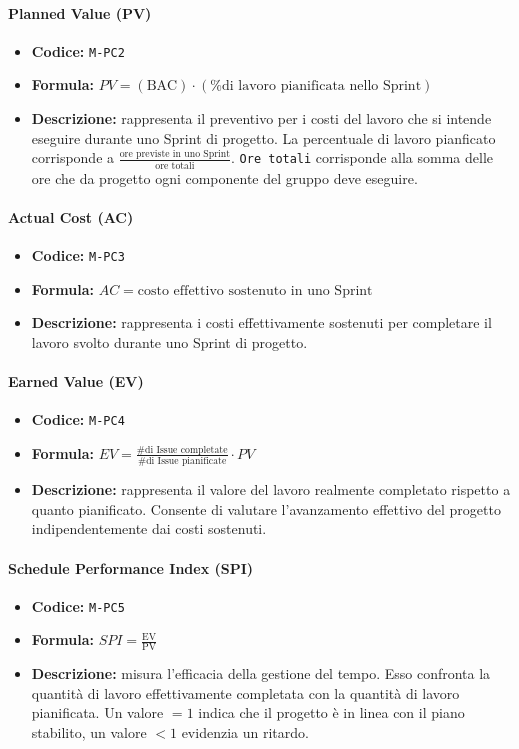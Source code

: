 \documentclass[a4paper,12pt]{article}
\begin{document}
\paragraph{Planned Value (PV)}
\begin{itemize}
    \item \textbf{Codice:} \texttt{M-PC2}
    \item \textbf{Formula:} $PV=(\text{BAC})\cdot(\text{\% di lavoro pianificata nello Sprint})$
    \item \textbf{Descrizione:} rappresenta il preventivo per i costi del lavoro che si intende eseguire durante uno Sprint di progetto. La percentuale di lavoro pianficato corrisponde a $\frac{\text{ore previste in uno Sprint}}{\text{ore totali}}$. \texttt{Ore totali} corrisponde alla somma delle ore che da progetto ogni componente del gruppo deve eseguire.
\end{itemize}

\paragraph{Actual Cost (AC)}
\begin{itemize}
    \item \textbf{Codice:} \texttt{M-PC3}
    \item \textbf{Formula:} $AC=\text{costo effettivo sostenuto in uno Sprint}$
    \item \textbf{Descrizione:} rappresenta i costi effettivamente sostenuti per completare il lavoro svolto durante uno Sprint di progetto.
\end{itemize}

\paragraph{Earned Value (EV)}
\begin{itemize}
    \item \textbf{Codice:} \texttt{M-PC4}
    \item \textbf{Formula:} $EV=\frac{\text{\# di Issue completate}}{\text{\# di Issue pianificate}}\cdot PV$
    \item \textbf{Descrizione:} rappresenta il valore del lavoro realmente completato rispetto a quanto pianificato. Consente di valutare l’avanzamento effettivo del progetto indipendentemente dai costi sostenuti.
\end{itemize}

\paragraph{Schedule Performance Index (SPI)}
\begin{itemize}
    \item \textbf{Codice:} \texttt{M-PC5}
    \item \textbf{Formula:} $SPI=\frac{\text{EV}}{\text{PV}}$
    \item \textbf{Descrizione:} misura l'efficacia della gestione del tempo. 
    Esso confronta la quantità di lavoro effettivamente completata con la quantità di lavoro pianificata. Un valore $=1$ indica che il progetto è in linea con il piano stabilito, un valore $<1$ evidenzia un ritardo.
\end{itemize}
\end{document}
